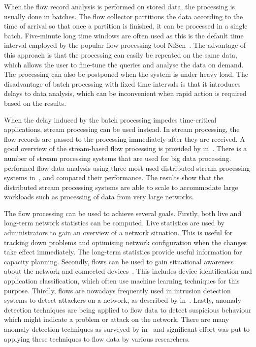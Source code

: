 When the flow record analysis is performed on stored data, the processing is usually done in batches. The flow collector partitions the data according to the time of arrival so that once a partition is finished, it can be processed in a single batch. Five-minute long time windows are often used as this is the default time interval employed by the popular flow processing tool NfSen~\cite{Haag-2011-NfSen}. The advantage of this approach is that the processing can easily be repeated on the same data, which allows the user to fine-tune the queries and analyse the data on demand. The processing can also be postponed when the system is under heavy load. The disadvantage of batch processing with fixed time intervals is that it introduces delays to data analysis, which can be inconvenient when rapid action is required based on the results.

When the delay induced by the batch processing impedes time-critical applications, stream processing can be used instead. In stream processing, the flow records are passed to the processing immediately after they are received. A good overview of the stream-based flow processing is provided by \citeauthor{Jirsik-2017-Toward} in~\cite{Jirsik-2017-Toward}. There is a number of stream processing systems that are used for big data processing. \citeauthor{Cermak-2016-Performance} performed flow data analysis using three most used distributed stream processing systems in~\cite{Cermak-2016-Performance}, and compared their performance. The results show that the distributed stream processing systems are able to scale to accommodate large workloads such as processing of data from very large networks.

The flow processing can be used to achieve several goals. Firstly, both live and long-term network statistics can be computed. Live statistics are used by administrators to gain an overview of a network situation. This is useful for tracking down problems and optimising network configuration when the changes take effect immediately. The long-term statistics provide useful information for capacity planning. Secondly, flows can be used to gain situational awareness about the network and connected devices~\cite{Lastovicka-2017-Situational}. This includes device identification and application classification, which often use machine learning techniques for this purpose. Thirdly, flows are nowadays frequently used in intrusion detection systems to detect attackers on a network, as described by \citeauthor{Umer-2017-Flow} in~\cite{Umer-2017-Flow}. Lastly, anomaly detection techniques are being applied to flow data to detect suspicious behaviour which might indicate a problem or attack on the network. There are many anomaly detection techniques as surveyed by \citeauthor{Chandola-2009-Anomaly} in~\cite{Chandola-2009-Anomaly} and significant effort was put to applying these techniques to flow data by various researchers.

